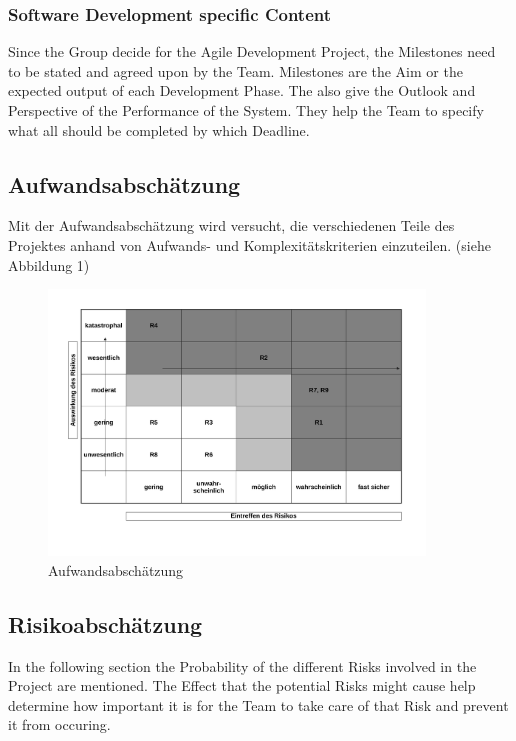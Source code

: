 \documentclass[a4paper, 11pt, ngerman, fleqn]{article}
\begin{document}
\subsubsection{Software Development specific Content}
Since the Group decide for the Agile Development Project, the Milestones need to be stated and agreed upon by the Team. Milestones are the Aim or the expected output of each Development Phase. The also give the Outlook and Perspective of the Performance of the System. They help the Team to specify what all should be completed by which Deadline.

\subsection{Aufwandsabschätzung}
Mit der Aufwandsabschätzung wird versucht, die verschiedenen Teile des Projektes anhand von Aufwands- und Komplexitätskriterien einzuteilen. (siehe Abbildung 1)
\clearpage
	\begin{figure}
		\begin{center}
			\includegraphics[width= 10cm]{figures/Aufwandsabschaetzung.pdf}
			\caption{Aufwandsabschätzung}
		\end{center}
	\end{figure}

\subsection{Risikoabschätzung}
In the following section the Probability of the different Risks involved in the Project are mentioned. The Effect that the potential Risks might cause help determine how important it is for the Team to take care of that Risk and prevent it from occuring.
\end{document}
